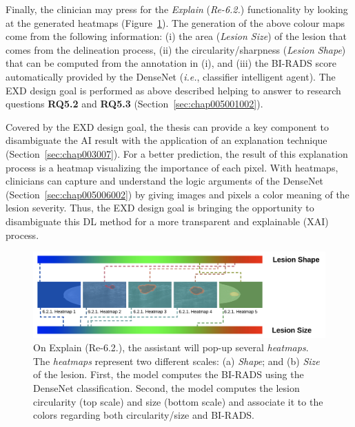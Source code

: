 \textcolor{revised}{Finally, the clinician may press for the {\it Explain} ({\it Re-6.2.}) functionality  by looking at the generated heatmaps (Figure~\ref{fig:fig032}).
The generation of the above colour maps come from the following information:
(i) the area ({\it Lesion Size}) of the lesion that comes from the delineation process,
(ii) the circularity/sharpness ({\it Lesion Shape}) that can be computed from the annotation in (i), and
(iii) the \ac{BI-RADS} score automatically provided by the DenseNet ({\it i.e.}, classifier intelligent agent).
The \ac{EXD} design goal is performed as above described helping to answer to research questions {\bf RQ5.2} and {\bf RQ5.3} (Section~\ref{sec:chap005001002}).}

Covered by the \ac{EXD} design goal, the thesis can provide a key component to disambiguate the \ac{AI} result with the application of an explanation technique (Section~\ref{sec:chap003007}).
For a better prediction, the result of this explanation process is a heatmap visualizing the importance of each pixel.
With heatmaps, clinicians can capture and understand the logic arguments of the DenseNet (Section~\ref{sec:chap005006002}) by giving images and pixels a color meaning of the lesion severity.
Thus, the \ac{EXD} design goal is bringing the opportunity to disambiguate this \ac{DL} method for a more transparent and explainable (\ac{XAI}) process.


\begin{figure}[htbp]
\centering
\includegraphics[width=\columnwidth]{images/fig032}
\caption{On Explain (Re-6.2.), the assistant will pop-up several {\it heatmaps}. The {\it heatmaps} represent two different scales: (a) {\it Shape}; and (b) {\it Size} of the lesion. First, the model computes the BI-RADS using the DenseNet classification. Second, the model computes the lesion circularity (top scale) and size (bottom scale) and associate it to the colors regarding both circularity/size and BI-RADS.}
\label{fig:fig032}
\end{figure}

